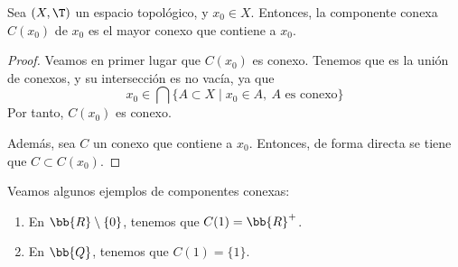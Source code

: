 \begin{prop}
    Sea $(X,\T)$ un espacio topológico, y $x_0\in X$. Entonces, la componente conexa $C(x_0)$ de $x_0$ es el mayor conexo que contiene a $x_0$.
\end{prop}
\begin{proof}
    Veamos en primer lugar que $C(x_0)$ es conexo. Tenemos que es la unión de conexos, y su intersección es no vacía,
    ya que $$x_0\in \bigcap\{A\subset X\mid x_0\in A,~A\text{ es conexo}\}$$
    Por tanto, $C(x_0)$ es conexo.

    Además, sea $C$ un conexo que contiene a $x_0$. Entonces, de forma directa se tiene que $C\subset C(x_0)$.
\end{proof}

\begin{ejemplo}
    Veamos algunos ejemplos de componentes conexas:
    \begin{enumerate}
        \item En $\bb{R}\setminus \{0\}$, tenemos que $C(1)=\bb{R}^+$.
        \item En $\bb{Q}$, tenemos que $C(1)=\{1\}$.
    \end{enumerate}
\end{ejemplo}

